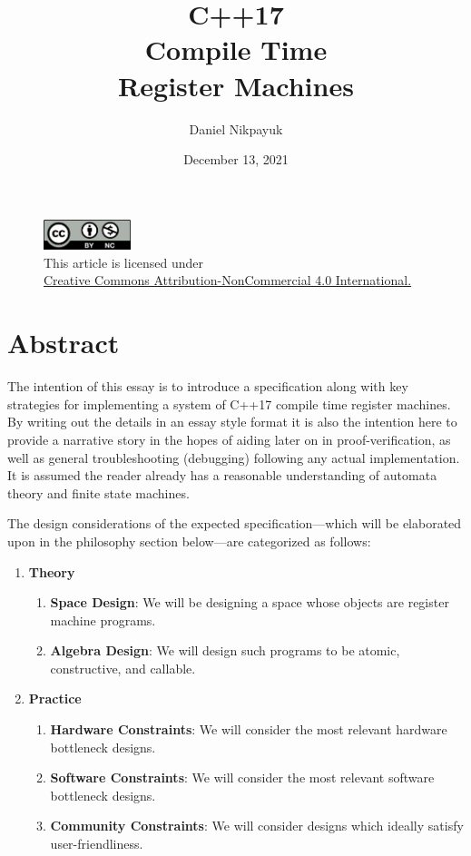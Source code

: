 \documentclass[twoside]{article}
\title{C++17\\Compile Time\\Register Machines}
\author{Daniel Nikpayuk}
\date{December 13, 2021}
\newcommand{\strong}[1]{{\bfseries #1}}
\begin{document}
\maketitle
\thispagestyle{empty}

\begin{figure}[h]
\centering
\includegraphics[width=1in]{../../../cc-by-nc.png}\\[0.1in]
\tiny This article is licensed under \\
\href{http://creativecommons.org/licenses/by-nc/4.0/}
{Creative Commons Attribution-NonCommercial 4.0 International.}\\[0.3in]
\end{figure}

\section*{Abstract}

The intention of this essay is to introduce a specification along with key strategies for implementing
a system of C++17 compile time register machines. By writing out the details in an essay style format
it is also the intention here to provide a narrative story in the hopes of aiding later on in
proof-verification, as well as general troubleshooting (debugging) following any actual implementation.
It is assumed the reader already has a reasonable understanding of automata theory and finite state machines.

The design considerations of the expected specification---which will be elaborated upon in the philosophy
section below---are categorized as follows:

\begin{enumerate}
\item \strong{Theory}
	\begin{enumerate}
	\item \strong{Space Design}: We will be designing a space whose objects are register machine programs.
	\item \strong{Algebra Design}: We will design such programs to be atomic, constructive, and callable.
	\end{enumerate}
\item \strong{Practice}
	\begin{enumerate}
	\item \strong{Hardware Constraints}: We will consider the most relevant hardware bottleneck designs.
	\item \strong{Software Constraints}: We will consider the most relevant software bottleneck designs.
	\item \strong{Community Constraints}: We will consider designs which ideally satisfy user-friendliness.
	\end{enumerate}
\end{enumerate}
\end{document}
